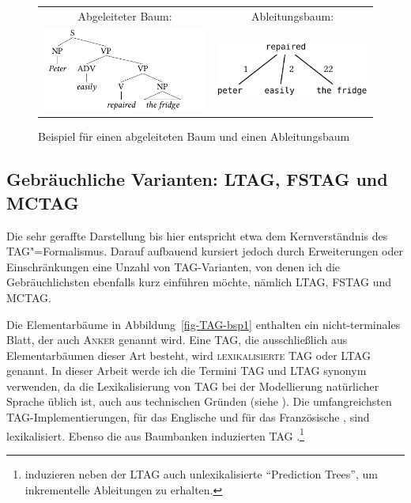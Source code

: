 \begin{figure}[t]
\centering
\begin{tabular}{cc}
Abgeleiteter Baum:\hspace*{3em} & Ableitungsbaum:\hspace*{4em} \\[2ex]
\begin{minipage}{17em}
\hspace{-1.5em}
\includegraphics{graphics/abb52a.pdf}
\end{minipage}
&
\hspace{-2em}
\includegraphics{graphics/abb52b.pdf}
\end{tabular}
\caption{\label{fig-TAG-bsp2}Beispiel für einen abgeleiteten Baum und einen Ableitungsbaum}
\end{figure}

\subsection{Gebräuchliche Varianten: LTAG, FSTAG und MCTAG}

Die sehr geraffte Darstellung bis hier entspricht etwa dem Kernverständnis des TAG"=Formalismus. Darauf aufbauend kursiert jedoch durch Erweiterungen oder Einschränkungen eine Unzahl von TAG-Varianten, von denen ich die Gebräuchlichsten ebenfalls kurz einführen möchte, nämlich LTAG, FSTAG und MCTAG.  

Die Elementarbäume in Abbildung~\ref{fig-TAG-bsp1} enthalten ein nicht-terminales Blatt, der auch \textsc{Anker} genannt wird. Eine TAG, die ausschlie\ss lich aus Elementarbäumen dieser Art besteht, wird \textsc{lexikalisierte TAG} oder LTAG genannt. In dieser Arbeit werde ich die Termini TAG und LTAG synonym verwenden, da die Lexikalisierung von TAG bei der Modellierung natürlicher Sprache üblich ist, auch aus technischen Gründen (siehe \citealt{Schabes:etal:88, Schabes:90, Schabes:Joshi:90, Joshi:Schabes:91b}). Die umfangreichsten TAG-Implementierungen,  für das Englische \citep{xtag:01} und  für das Französische \citep{Abeille:02}, sind lexikalisiert. Ebenso die aus Baumbanken induzierten TAG \citep{Chiang:00,Xia:01,Chen:etal:06,Kaehammer:Demberg:12}.\footnote{\cite{Kaehammer:Demberg:12} induzieren neben der LTAG auch unlexikalisierte "`Prediction Trees"', um inkrementelle Ableitungen zu erhalten.}

